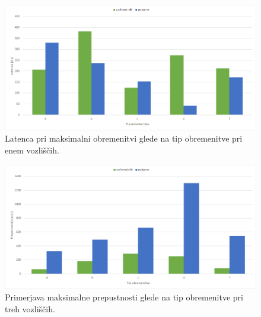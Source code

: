 \documentclass[a4paper, 12pt]{book}
\begin{document}
\begin{figure}[H]
\begin{center}
\includegraphics[width=1\textwidth]{resources/maxThroughput-latency-n1-v2.png}
\end{center}
\caption{Latenca pri maksimalni obremenitvi glede na tip obremenitve pri enem vozliščih.}
\label{img_ycsb_results_max_throughput_latency_n1}
\end{figure}

\newpage

\begin{figure}[H]
\begin{center}
\includegraphics[width=1\textwidth]{resources/maxThroughput-n3-v2.png}
\end{center}
\caption{Primerjava maksimalne prepustnosti glede na tip obremenitve pri treh vozliščih.}
\label{img_ycsb_results_max_throughput_n3}
\end{figure}
\end{document}
